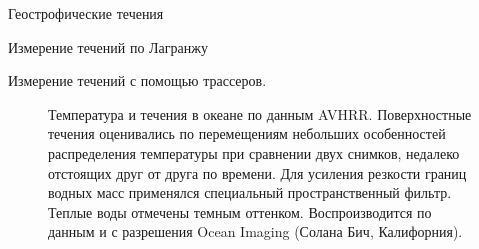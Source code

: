 \begin{chapter}{Геострофические течения}
\begin{section}{Измерение течений по Лагранжу}
\begin{paragraph}{Измерение течений с помощью трассеров.}
\begin{figure}[t!]
\caption{Температура и течения в океане по данным AVHRR. 
Поверхностные течения оценивались по перемещениям
небольших особенностей распределения температуры при сравнении двух снимков, 
недалеко отстоящих друг от друга по времени.
Для усиления резкости границ водных масс применялся специальный 
пространственный фильтр. Теплые воды отмечены темным оттенком. 
Воспроизводится по данным и с разрешения Ocean Imaging (Солана Бич, Калифорния).}
\label{Fig10.16.bw}
\end{figure}
%


\end{paragraph}
\end{section}
\end{chapter}
